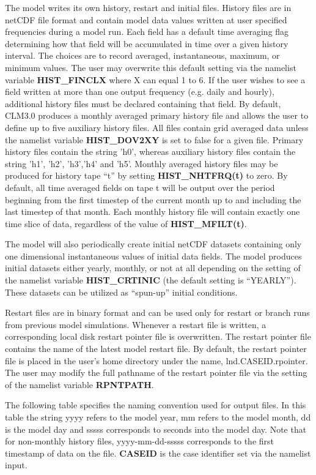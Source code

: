 The model writes its own history, restart and initial files. History
files are in netCDF file format and contain model data values written
at user specified frequencies during a model run.  Each field has a
default time averaging flag determining how that field will be
accumulated in time over a given history interval.  The choices are to
record averaged, instantaneous, maximum, or minimum values.  The user
may overwrite this default setting via the namelist variable {\bf
HIST\_FINCLX} where X can equal 1 to 6.  If the user wishes to see a
field written at more than one output frequency (e.g. daily and
hourly), additional history files must be declared containing that
field.  By default, CLM3.0 produces a monthly averaged primary history
file and allows the user to define up to five auxiliary history files.
All files contain grid averaged data unless the namelist variable {\bf
HIST\_DOV2XY} is set to false for a given file.  Primary history files
contain the string 'h0', whereas auxiliary history files contain the
string 'h1', 'h2', 'h3','h4' and 'h5'.  Monthly averaged history files
may be produced for history tape ``t'' by setting {\bf
HIST\_NHTFRQ(t)} to zero.  By default, all time averaged fields on
tape t will be output over the period beginning from the first
timestep of the current month up to and including the last timestep of
that month. Each monthly history file will contain exactly one time
slice of data, regardless of the value of {\bf HIST\_MFILT(t)}.

The model will also periodically create initial netCDF datasets
containing only one dimensional instantaneous values of initial data
fields. The model produces initial datasets either yearly, monthly, or
not at all depending on the setting of the namelist variable {\bf
HIST\_CRTINIC} (the default setting is ``YEARLY'').  These datasets
can be utilized as ``spun-up'' initial conditions.

Restart files are in binary format and can be used only for restart or
branch runs from previous model simulations.  Whenever a restart file
is written, a corresponding local disk restart pointer file is
overwritten. The restart pointer file contains the name of the latest
model restart file. By default, the restart pointer file is placed in
the user's home directory under the name, lnd.CASEID.rpointer. The
user may modify the full pathname of the restart pointer file via
the setting of the namelist variable {\bf RPNTPATH}.

The following table specifies the naming convention used for output
files.  In this table the string yyyy refers to the model year, mm
refers to the model month, dd is the model day and sssss corresponds
to seconds into the model day. Note that for non-monthly history
files, yyyy-mm-dd-sssss corresponds to the first timestamp of data on
the file. {\bf CASEID} is the case identifier set via the namelist
input.

